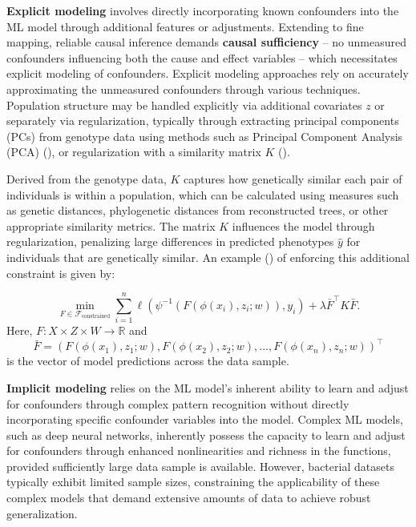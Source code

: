 \documentclass[12pt]{article}
\begin{document}
\textbf{Explicit modeling} involves directly incorporating known confounders into the ML model through additional features or adjustments. Extending to fine mapping, reliable causal inference demands \textbf{causal sufficiency} -- no unmeasured confounders influencing both the cause and effect variables -- which necessitates explicit modeling of confounders. Explicit modeling approaches rely on accurately approximating the unmeasured confounders through various techniques. Population structure may be handled explicitly via additional covariates $z$ or separately via regularization, typically through extracting principal components (PCs) from genotype data using methods such as Principal Component Analysis (PCA) (\cite{kavvas2020biochemically, kouchaki2019application}), or regularization with a similarity matrix $K$ (\cite{farhat2019gwas, yurtseven2023machine}).



Derived from the genotype data, $K$ captures how genetically similar each pair of individuals is within a population, which can be calculated using measures such as genetic distances, phylogenetic distances from reconstructed trees, or other appropriate similarity metrics. The matrix $K$ influences the model through regularization, penalizing large differences in predicted phenotypes $\hat{y}$ for individuals that are genetically similar. An example (\cite{yurtseven2023machine}) of enforcing this additional constraint is given by:

\begin{equation}
\min_{F \in \mathcal{F}_{\text{constrained}}} \sum_{i=1}^n \ell(\psi^{-1}(F(\phi(x_i),z_i; w)),y_i) + 
\lambda {\bar F}^\intercal K {\bar F}.
\end{equation}
Here, $F: X \times Z \times W \to \mathbb{R}$ and 
\[
{\bar F} = ( 
F(\phi(x_1),z_1; w),
F(\phi(x_2),z_2; w),
...,
F(\phi(x_n),z_n; w)
)^\intercal \]
is the vector of model predictions across the data sample.


\textbf{Implicit modeling} relies on the ML model's inherent ability to learn and adjust for confounders through complex pattern recognition without directly incorporating specific confounder variables into the model. Complex ML models, such as deep neural networks, inherently possess the capacity to learn and adjust for confounders through enhanced nonlinearities and richness in the functions, provided sufficiently large data sample is available. However, bacterial datasets typically exhibit limited sample sizes, constraining the applicability of these complex models that demand extensive amounts of data to achieve robust generalization.
\end{document}
